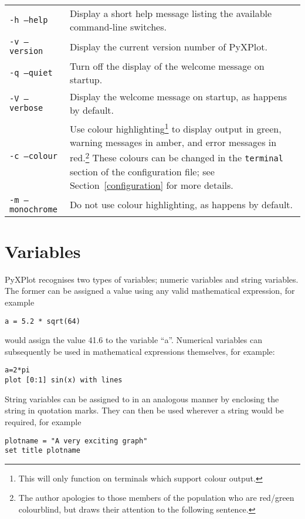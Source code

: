 \begin{longtable}{p{3.5cm}p{8.5cm}}
\texttt{-h --help} & Display a short help message listing the available command-line switches.\\
\texttt{-v --version} & Display the current version number of PyXPlot.\\
\texttt{-q --quiet} & Turn off the display of the welcome message on startup. \\
\texttt{-V --verbose} & Display the welcome message on startup, as happens by default. \\
\texttt{-c --colour} & Use colour highlighting\footnote{This will only function on terminals which support colour output.} to display output in green, warning messages in amber, and error messages in red.\footnote{The author apologies to those members of the population who are red/green colourblind, but draws their attention to the following sentence.} These colours can be changed in the \texttt{terminal} section of the configuration file; see Section~\ref{configuration} for more details. \\
\texttt{-m --monochrome} & Do not use colour highlighting, as happens by default. \\
\end{longtable}

\section{Variables}

PyXPlot recognises two types of variables; numeric variables and string
variables.  The former can be assigned a value using any valid mathematical
expression, for example

\begin{verbatim}
a = 5.2 * sqrt(64)
\end{verbatim}

would assign the value 41.6 to the variable ``a''.  Numerical variables can
subsequently be used in mathematical expressions themselves, for example:

\begin{verbatim}
a=2*pi
plot [0:1] sin(x) with lines
\end{verbatim}

String variables can be assigned to in an analogous manner by enclosing the
string in quotation marks.  They can then be used wherever a string would be
required, for example

\begin{verbatim}
plotname = "A very exciting graph"
set title plotname
\end{verbatim}

